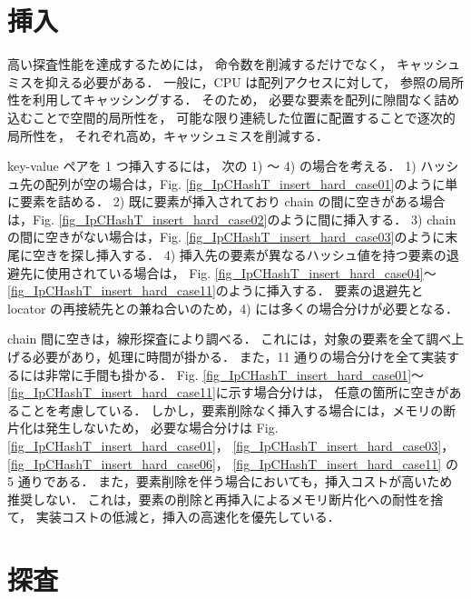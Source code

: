 \leavevmode \newline
\section{挿入}

高い探査性能を達成するためには，
命令数を削減するだけでなく，
キャッシュミスを抑える必要がある．
一般に，CPU は配列アクセスに対して，
参照の局所性を利用してキャッシングする．
そのため，
必要な要素を配列に隙間なく詰め込むことで空間的局所性を，
可能な限り連続した位置に配置することで逐次的局所性を，
それぞれ高め，キャッシュミスを削減する．

key-value ペアを 1 つ挿入するには，
次の 1) 〜 4) の場合を考える．
1) ハッシュ先の配列が空の場合は，Fig. \ref{fig_IpCHashT_insert_hard_case01}のように単に要素を詰める．
2) 既に要素が挿入されており chain の間に空きがある場合は，Fig. \ref{fig_IpCHashT_insert_hard_case02}のように間に挿入する．
3) chain の間に空きがない場合は，Fig. \ref{fig_IpCHashT_insert_hard_case03}のように末尾に空きを探し挿入する．
4) 挿入先の要素が異なるハッシュ値を持つ要素の退避先に使用されている場合は，
Fig. \ref{fig_IpCHashT_insert_hard_case04}〜\ref{fig_IpCHashT_insert_hard_case11}のように挿入する．
要素の退避先と locator の再接続先との兼ね合いのため，4) には多くの場合分けが必要となる．

chain 間に空きは，線形探査により調べる．
これには，対象の要素を全て調べ上げる必要があり，処理に時間が掛かる．
また，11 通りの場合分けを全て実装するには非常に手間も掛かる．
Fig. \ref{fig_IpCHashT_insert_hard_case01}〜\ref{fig_IpCHashT_insert_hard_case11}に示す場合分けは，
任意の箇所に空きがあることを考慮している．
しかし，要素削除なく挿入する場合には，メモリの断片化は発生しないため，
必要な場合分けは
Fig. \ref{fig_IpCHashT_insert_hard_case01}，
\ref{fig_IpCHashT_insert_hard_case03}，
\ref{fig_IpCHashT_insert_hard_case06}，
\ref{fig_IpCHashT_insert_hard_case11}
の 5 通りである．
また，要素削除を伴う場合においても，挿入コストが高いため推奨しない．
これは，要素の削除と再挿入によるメモリ断片化への耐性を捨て，
実装コストの低減と，挿入の高速化を優先している．


\section{探査}

